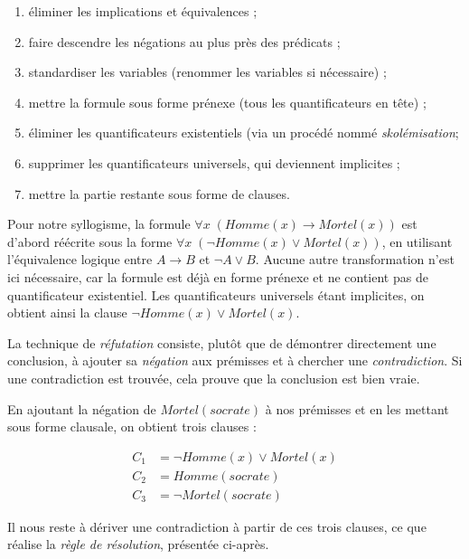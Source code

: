 \documentclass[11pt]{article}
\begin{document}
\begin{enumerate}
    \item éliminer les implications et équivalences ;
    \item faire descendre les négations au plus près des prédicats ;
    \item standardiser les variables (renommer les variables si nécessaire) ;
    \item mettre la formule sous forme prénexe (tous les quantificateurs en tête) ;
    \item éliminer les quantificateurs existentiels (via un procédé nommé \textit{skolémisation};
    \item supprimer les quantificateurs universels, qui deviennent implicites ;
    \item mettre la partie restante sous forme de clauses.
\end{enumerate}

Pour notre syllogisme, la formule 
$\forall x\; (\mathit{Homme}(x) \rightarrow \mathit{Mortel}(x))$ 
est d’abord réécrite sous la forme 
$\forall x\; (\neg \mathit{Homme}(x) \vee \mathit{Mortel}(x))$, 
en utilisant l’équivalence logique entre 
$A \rightarrow B$ et $\neg A \vee B$. Aucune autre transformation n’est ici nécessaire, car la formule est déjà en  forme prénexe et ne contient pas de quantificateur existentiel.
Les quantificateurs universels étant implicites, on obtient ainsi la clause 
$\neg \mathit{Homme}(x) \vee \mathit{Mortel}(x)$.

\vspace{0.2cm}
La technique de \textit{réfutation} consiste, plutôt que de démontrer directement une conclusion, à ajouter sa \textit{négation} aux prémisses et à chercher une \textit{contradiction}. Si une contradiction est trouvée, cela prouve que la conclusion est bien vraie.

\vspace{0.2cm}
En ajoutant la négation de $\mathit{Mortel}(\mathit{socrate})$ à nos prémisses et en les mettant sous forme clausale, on obtient trois clauses :

\begin{align*}
    C_1 &= \neg\mathit{Homme}(x) \vee \mathit{Mortel}(x) \\
    C_2 &= \mathit{Homme}(\mathit{socrate}) \\
    C_3 &= \neg\mathit{Mortel}(\mathit{socrate})
\end{align*}

Il nous reste à dériver une contradiction à partir de ces trois clauses, 
ce que réalise la \textit{règle de résolution}, présentée ci-après.
\end{document}
